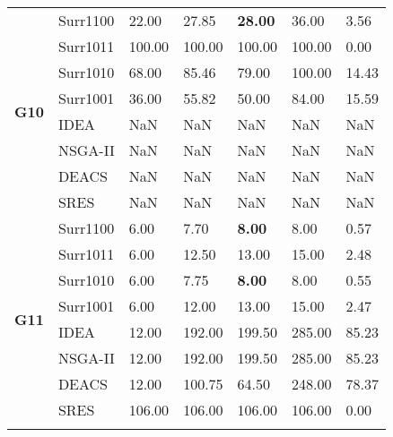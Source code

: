 \begin{table*}[!htb]
\begin{tabular}{lllllll}
		\multirow{8}{*}{\textbf{G10}}               & Surr1100      & 22.00         & 27.85         & \textbf{28.00}  & 36.00          & 3.56         \\ 
		& Surr1011      & 100.00        & 100.00        & 100.00          & 100.00         & 0.00         \\ 
		& Surr1010      & 68.00         & 85.46         & 79.00           & 100.00         & 14.43        \\ 
		& Surr1001      & 36.00         & 55.82         & 50.00           & 84.00          & 15.59        \\ 
		& IDEA          & NaN           & NaN           & NaN             & NaN            & NaN          \\
		& NSGA-II       & NaN           & NaN           & NaN             & NaN            & NaN          \\ 
		& DEACS         & NaN           & NaN           & NaN             & NaN            & NaN          \\ 
		& SRES          & NaN           & NaN           & NaN             & NaN            & NaN          \\ \hline
		\multirow{8}{*}{\textbf{G11}}               & Surr1100      & 6.00          & 7.70          & \textbf{8.00}   & 8.00           & 0.57         \\  
		& Surr1011      & 6.00          & 12.50         & 13.00           & 15.00          & 2.48         \\  
		& Surr1010      & 6.00          & 7.75          & \textbf{8.00}   & 8.00           & 0.55         \\ 
		& Surr1001      & 6.00          & 12.00         & 13.00           & 15.00          & 2.47         \\  
		& IDEA          & 12.00         & 192.00        & 199.50          & 285.00         & 85.23        \\  
		& NSGA-II       & 12.00         & 192.00        & 199.50          & 285.00         & 85.23        \\  
		& DEACS         & 12.00         & 100.75        & 64.50           & 248.00         & 78.37        \\ 
		& SRES          & 106.00        & 106.00        & 106.00          & 106.00         & 0.00         \\ \specialrule{.2em}{.1em}{.1em} 
	\end{tabular}
\end{table*}
\clearpage

